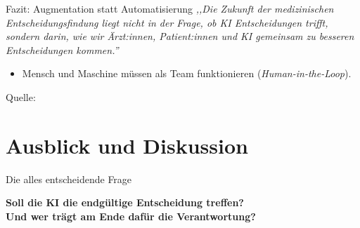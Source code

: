 \documentclass[aspectratio=169]{beamer}
\begin{document}
\begin{frame}{Fazit: Augmentation statt Automatisierung}
    \textit{,,Die Zukunft der medizinischen Entscheidungsfindung liegt nicht in der Frage, ob KI Entscheidungen trifft, sondern darin, wie wir Ärzt:innen, Patient:innen und KI gemeinsam zu besseren Entscheidungen kommen.''} \parencite{roche2025}
    
    \vspace{0.4cm}
    \begin{itemize}
        \item Mensch und Maschine müssen als Team funktionieren (\textit{Human-in-the-Loop}).
    \end{itemize}

    \vfill
    {\tiny Quelle: }
\end{frame}



\section{Ausblick und Diskussion}
\begin{frame}{Die alles entscheidende Frage}

    \vspace{0.6cm}
    \begin{center}
        \textbf{\Large Soll die KI die endgültige Entscheidung treffen?} \\
        \vspace{0.4cm}
        \textbf{\Large Und wer trägt am Ende dafür die Verantwortung?}
    \end{center}
\end{frame}
\end{document}

